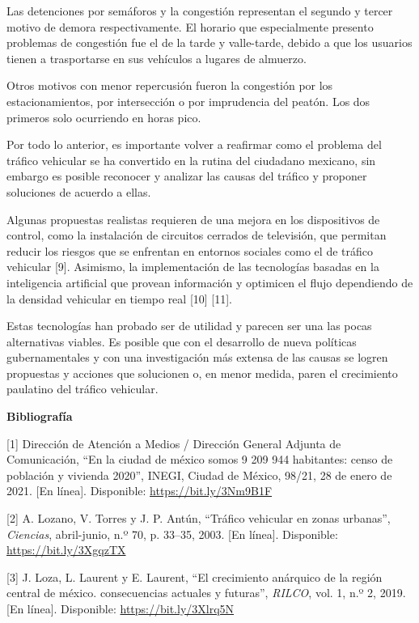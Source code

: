 \documentclass[12pt]{article}
\begin{document}
    Las detenciones por semáforos y la congestión representan el segundo y tercer motivo de demora respectivamente. El horario que especialmente presento problemas de congestión fue el de la tarde y valle-tarde, debido a que los usuarios tienen a trasportarse en sus vehículos a lugares de almuerzo. 
    
    Otros motivos con menor repercusión fueron la congestión por los estacionamientos, por intersección o por imprudencia del peatón. Los dos primeros solo ocurriendo en horas pico.

    Por todo lo anterior, es importante volver a reafirmar como el problema del tráfico vehicular se ha convertido en la rutina del ciudadano mexicano, sin embargo es posible reconocer y analizar las causas del tráfico y proponer soluciones de acuerdo a ellas.
    
    Algunas propuestas realistas requieren de una mejora en los dispositivos de control, como la instalación de circuitos cerrados de televisión, que permitan reducir los riesgos que se enfrentan en entornos sociales como el de tráfico vehicular [9]. Asimismo, la implementación de las tecnologías basadas en la inteligencia artificial que provean información y optimicen el flujo dependiendo de la densidad vehicular en tiempo real [10] [11].
    
    Estas tecnologías han probado ser de utilidad y parecen ser una las pocas alternativas viables. Es posible que con el desarrollo de nueva políticas gubernamentales y con una investigación más extensa de las causas se logren propuestas y acciones que solucionen o, en menor medida, paren el crecimiento paulatino del tráfico vehicular.
    \hfil \break

    \setlength{\parindent}{0cm}    
    \textbf{Bibliografía}

    [1] Dirección de Atención a Medios / Dirección General Adjunta de Comunicación, ``En la ciudad de méxico somos 9 209 944 habitantes: censo de población y vivienda 2020'', INEGI, Ciudad de México, 98/21, 28 de enero de 2021. [En línea]. Disponible: \url{https://bit.ly/3Nm9B1F} 
    \hfil \break

    [2] A. Lozano, V. Torres y J. P. Antún, ``Tráfico vehicular en zonas urbanas'', \textit{Ciencias}, abril-junio, n.º 70, p. 33–35, 2003. [En línea]. Disponible: \url{https://bit.ly/3XgqzTX}
    \hfil \break

    [3] J. Loza, L. Laurent y E. Laurent, ``El crecimiento anárquico de la región central de méxico. consecuencias actuales y futuras'', \textit{RILCO}, vol. 1, n.º 2, 2019. [En línea]. Disponible: \url{https://bit.ly/3Xlrq5N}
    \hfil \break
\end{document}
